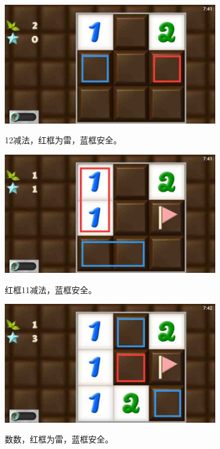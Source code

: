 \subsection{} %
\begin{center}
    \includegraphics[width=0.7\textwidth]{puzzlelow/10-1.jpg}
\end{center}
12减法，红框为雷，蓝框安全。
\begin{center}
    \includegraphics[width=0.7\textwidth]{puzzlelow/10-2.jpg}
\end{center}
红框11减法，蓝框安全。
\begin{center}
    \includegraphics[width=0.7\textwidth]{puzzlelow/10-3.jpg}
\end{center}
数数，红框为雷，蓝框安全。


